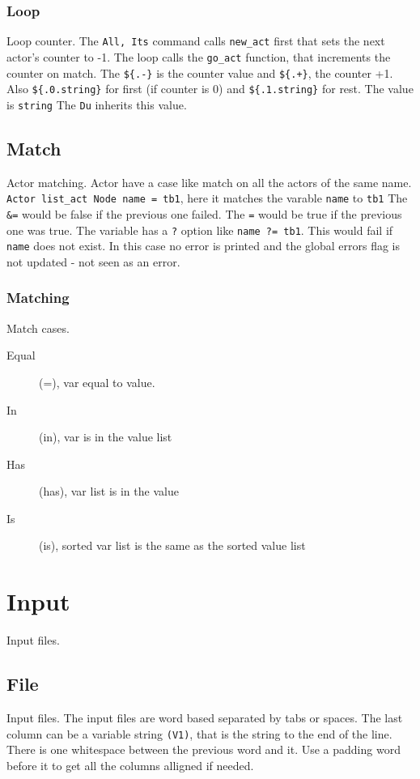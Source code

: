\documentclass[11pt]{article}
\begin{document}
\subsubsection{Loop}
Loop counter.
The \texttt{All,\ Its} command calls \texttt{new\_act} first that sets
the next actor's counter to -1. The loop calls the \texttt{go\_act}
function, that increments the counter on match. The \texttt{\$\{.-\}} is
the counter value and \texttt{\$\{.+\}}, the counter +1. Also
\texttt{\$\{.0.string\}} for first (if counter is 0) and
\texttt{\$\{.1.string\}} for rest. The value is \texttt{string} The
\texttt{Du} inherits this value.

\subsection{Match}
Actor matching.
Actor have a case like match on all the actors of the same name.
\texttt{Actor\ list\_act\ Node\ name\ =\ tb1}, here it matches the
varable \texttt{name} to \texttt{tb1} The \texttt{\&=} would be false if
the previous one failed. The \texttt{\textbar{}=} would be true if the
previous one was true. The variable has a \texttt{?} option like
\texttt{name\ ?=\ tb1}. This would fail if \texttt{name} does not exist.
In this case no error is printed and the global errors flag is not
updated - not seen as an error.

\subsubsection{Matching}
Match cases.
\begin{description}
\item[Equal]  (=), var equal to value.
\item[In]  (in), var is in the value list 
\item[Has]  (has), var list is in the value
\item[Is]  (is), sorted var list is the same as the sorted value list 
\end{description}
\section{Input}
Input files.
\subsection{File}
Input files.
The input files are word based separated by tabs or spaces. The last
column can be a variable string \texttt{(V1)}, that is the string to the
end of the line. There is one whitespace between the previous word and
it. Use a padding word before it to get all the columns alligned if
needed.
\end{document}
